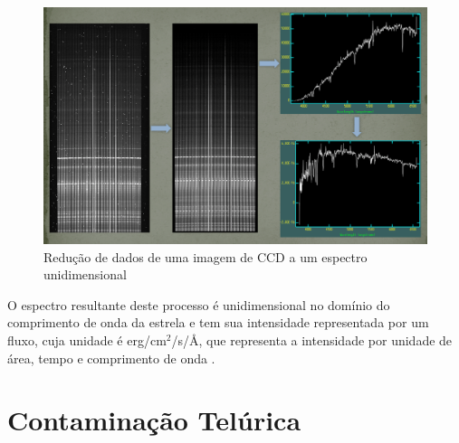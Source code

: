 
\begin{figure}[htb]
\centering
\includegraphics[width=15cm]{figuras/calibration_steps.jpg}
\caption{Redução de dados de uma imagem de CCD a um espectro unidimensional \citep{data-reduction-image}}
\label{fig:calibration-steps}
\end{figure}

O espectro resultante deste processo é unidimensional no domínio do comprimento de onda da estrela e tem sua intensidade representada por um fluxo, cuja unidade é erg/cm\(^{2}\)/s/Å, que representa a intensidade por unidade de área, tempo e comprimento de onda \citep{astronomical-measurements}.





\section{Contaminação Telúrica} \label{telluric-contamination}

